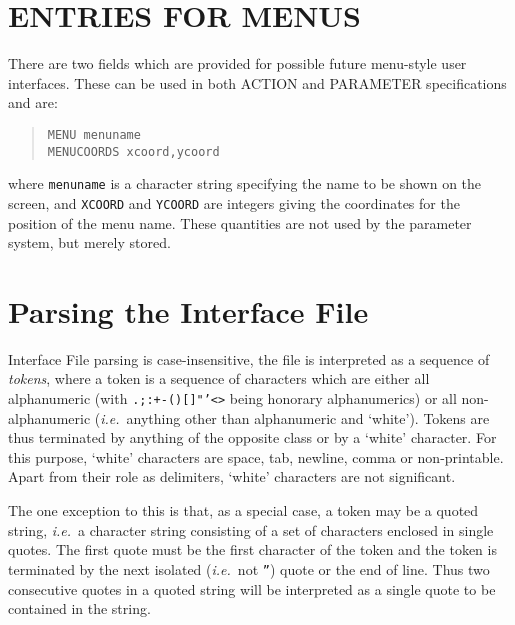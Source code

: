 \documentclass[twoside,11pt]{article}
\newcommand{\xlabel}[1]{}
\renewcommand{\_}{\texttt{\symbol{95}}}
\begin{document}
\section{ENTRIES FOR MENUS\xlabel{entries_for_menus}}

There are two fields which are provided for possible future
menu-style user interfaces. These can be used in both ACTION and
PARAMETER specifications and are:
\begin{quote} \begin{verbatim}
MENU menuname
MENUCOORDS xcoord,ycoord
\end{verbatim} \end{quote}
where \texttt{menuname} is a character string specifying the name to be shown on
the screen, and \texttt{XCOORD} and \texttt{YCOORD} are integers giving the
coordinates for the position of the menu name.
These quantities are not used by the parameter system, but merely stored.

\appendix
\newpage

\section{Parsing the Interface File\xlabel{parsing_the_interface_file}
\label{parsing}}

Interface File parsing is case-insensitive, the file is
interpreted as a sequence of {\em tokens}, where a token is a sequence of
characters which are either all alphanumeric (with \texttt{.;:+-()\_[]"'<>} being
honorary alphanumerics) or all non-alphanumeric ({\em i.e.}\ anything other
than alphanumeric and `white').
Tokens are thus terminated by anything of the opposite class or by a `white'
character.
For this purpose, `white' characters are space, tab, newline, comma or
non-printable.
Apart from their role as delimiters, `white' characters are not significant.

The one exception to this is that, as a special case, a token may be a
quoted string, {\em i.e.}\ a character string consisting of a set of characters
enclosed in single quotes.
The first quote must be the first
character of the token and the token is terminated by the next isolated
({\em i.e.}\ not \texttt{''}) quote or the end of line.
Thus two consecutive quotes in a quoted string will be interpreted as a single
quote to be contained in the string.
\end{document}
